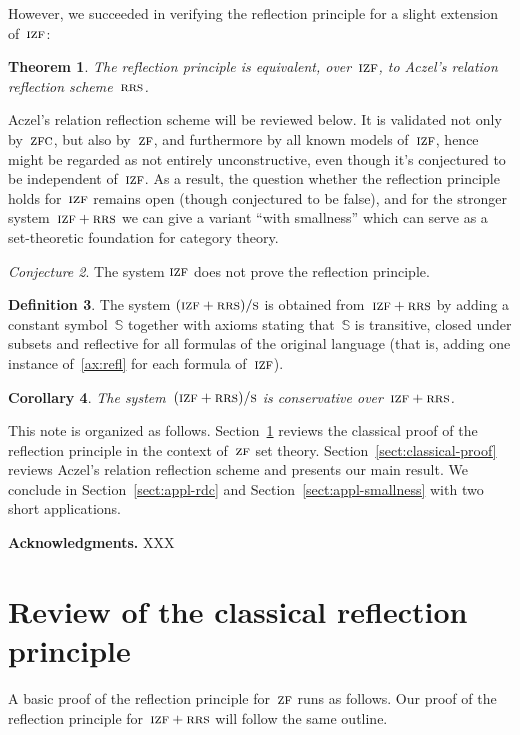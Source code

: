 \documentclass[oneside,reqno]{amsart}
\theoremstyle{definition}
\newtheorem{defn}{Definition}[section]
\theoremstyle{plain}
\newtheorem{cor}[defn]{Corollary}
\newtheorem{thm}[defn]{Theorem}
\theoremstyle{remark}
\newtheorem{conjecture}[defn]{Conjecture}
\renewcommand{\SS}{\mathbb{S}}
\renewcommand{\_}{\mathpunct{.}\,}
\newcommand{\?}{\,{:}\,}
\newcommand{\ZF}{\textsc{zf}}
\newcommand{\IZF}{\textsc{izf}}
\newcommand{\ZFC}{\textsc{zfc}}
\newcommand{\RRS}{\textsc{rrs}}
\newcommand{\ES}{(\IZF+\RRS)/\textsc{s}}
\begin{document}
However, we succeeded in verifying the reflection principle for a slight
extension of~$\IZF$:

\begin{thm}The reflection principle is equivalent, over~$\IZF$, to Aczel's relation reflection
scheme~$\RRS$.\end{thm}

Aczel's relation reflection scheme will be reviewed below. It is validated not
only by~$\ZFC$, but also by~$\ZF$, and furthermore by
all known models of~$\IZF$, hence might be regarded as not entirely
unconstructive, even though it's conjectured to be independent of~$\IZF$. As a
result, the question whether the reflection principle holds for~$\IZF$ remains
open (though conjectured to be false), and for the stronger system~$\IZF+\RRS$
we can give a variant ``with smallness'' which can serve as a set-theoretic
foundation for category theory.

\begin{conjecture}The system $\IZF$ does not prove the reflection
principle.\end{conjecture}

\begin{defn}The system $\ES$ is obtained from~$\IZF+\RRS$ by
adding a constant symbol~$\SS$ together with axioms
stating that~$\SS$ is transitive, closed under subsets and reflective for all
formulas of the original language (that is, adding one instance
of~\eqref{ax:refl} for each formula of~$\IZF$).\end{defn}

\begin{cor}The system~$\ES$ is conservative
over~$\IZF+\RRS$.\end{cor}

This note is organized as follows. Section~\ref{sect:review} reviews the
classical proof of the reflection principle in the context of~$\ZF$ set theory.
Section~\ref{sect:classical-proof} reviews Aczel's relation reflection scheme
and presents our main result. We conclude in Section~\ref{sect:appl-rdc} and
Section~\ref{sect:appl-smallness} with two short applications.

\textbf{Acknowledgments.} XXX


\section{Review of the classical reflection principle}
\label{sect:review}

A basic proof of the reflection principle for~$\ZF$ runs as follows. Our proof
of the reflection principle for~$\IZF+\RRS$ will follow the same outline.
\end{document}
